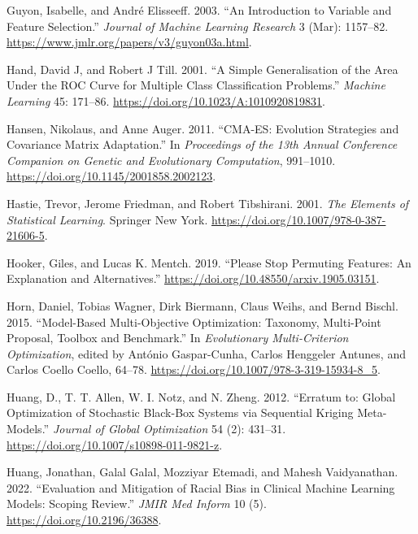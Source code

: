 \begin{CSLReferences}{1}{0}
\leavevmode{}%
Guyon, Isabelle, and André Elisseeff. 2003. {``An Introduction to
Variable and Feature Selection.''} \emph{Journal of Machine Learning
Research} 3 (Mar): 1157--82.
\url{https://www.jmlr.org/papers/v3/guyon03a.html}.

\leavevmode{}%
Hand, David J, and Robert J Till. 2001. {``A Simple Generalisation of
the Area Under the ROC Curve for Multiple Class Classification
Problems.''} \emph{Machine Learning} 45: 171--86.
\url{https://doi.org/10.1023/A:1010920819831}.

\leavevmode{}%
Hansen, Nikolaus, and Anne Auger. 2011. {``CMA-ES: Evolution Strategies
and Covariance Matrix Adaptation.''} In \emph{Proceedings of the 13th
Annual Conference Companion on Genetic and Evolutionary Computation},
991--1010. \url{https://doi.org/10.1145/2001858.2002123}.

\leavevmode{}%
Hastie, Trevor, Jerome Friedman, and Robert Tibshirani. 2001. \emph{The
Elements of Statistical Learning}. Springer New York.
\url{https://doi.org/10.1007/978-0-387-21606-5}.

\leavevmode{}%
Hooker, Giles, and Lucas K. Mentch. 2019. {``Please Stop Permuting
Features: An Explanation and Alternatives.''}
\url{https://doi.org/10.48550/arxiv.1905.03151}.

\leavevmode{}%
Horn, Daniel, Tobias Wagner, Dirk Biermann, Claus Weihs, and Bernd
Bischl. 2015. {``Model-Based Multi-Objective Optimization: Taxonomy,
Multi-Point Proposal, Toolbox and Benchmark.''} In \emph{Evolutionary
Multi-Criterion Optimization}, edited by António Gaspar-Cunha, Carlos
Henggeler Antunes, and Carlos Coello Coello, 64--78.
\url{https://doi.org/10.1007/978-3-319-15934-8_5}.

\leavevmode{}%
Huang, D., T. T. Allen, W. I. Notz, and N. Zheng. 2012. {``Erratum to:
Global Optimization of Stochastic Black-Box Systems via Sequential
Kriging Meta-Models.''} \emph{Journal of Global Optimization} 54 (2):
431--31. \url{https://doi.org/10.1007/s10898-011-9821-z}.

\leavevmode{}%
Huang, Jonathan, Galal Galal, Mozziyar Etemadi, and Mahesh Vaidyanathan.
2022. {``Evaluation and Mitigation of Racial Bias in Clinical Machine
Learning Models: Scoping Review.''} \emph{JMIR Med Inform} 10 (5).
\url{https://doi.org/10.2196/36388}.


\end{CSLReferences}
